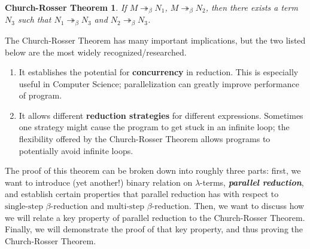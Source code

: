\documentclass[a4paper,11pt]{article}
\theoremstyle{definition}
\theoremstyle{example}
\theoremstyle{lemma}
\newcommand{\msbr}{\twoheadrightarrow_{\beta}}
\newcommand{\tssbr}{\text{single-step $\beta$-reduction}}
\newcommand{\tmsbr}{\text{multi-step $\beta$-reduction}}
\begin{document}
\theoremstyle{plain}
\newtheorem*{crt}{Church-Rosser Theorem}
\begin{crt}
If $M \msbr N_1$, $M \msbr N_2$, then there exists a term $N_3$ such that $N_1 \msbr N_3$ and $N_2 \msbr N_3$.
\end{crt}

The Church-Rosser Theorem has many important implications, but the two listed below are the most widely recognized/researched.
\vspace{-2mm}
\begin{enumerate}[noitemsep]
  \item It establishes the potential for \textbf{concurrency} in reduction. This is especially useful in Computer Science; parallelization can greatly improve performance of program. 
  \item It allows different \textbf{reduction strategies} for different expressions. Sometimes one strategy might cause the program to get stuck in an infinite loop; the flexibility offered by the Church-Rosser Theorem allows programs to potentially avoid infinite loops.
\end{enumerate}
\vspace{-2mm}

The proof of this theorem can be broken down into roughly three parts: first, we want to introduce (yet another!) binary relation on $\lambda$-terms, \textit{\textbf{parallel reduction}}, and establish certain properties that parallel reduction has with respect to $\tssbr$ and $\tmsbr$. Then, we want to discuss how we will relate a key property of parallel reduction to the Church-Rosser Theorem. Finally, we will demonstrate the proof of that key property, and thus proving the Church-Rosser Theorem.
\end{document}
